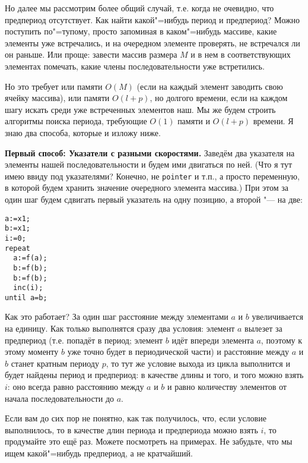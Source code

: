 Но далее мы рассмотрим более общий случай, т.е. когда не очевидно, что предпериод отсутствует. 
Как найти какой"=нибудь период и предпериод? Можно поступить по"=тупому, просто запоминая в 
каком"=нибудь массиве, какие элементы уже встречались, и на очередном элементе проверять, не 
встречался ли он раньше. Или проще: завести массив размера $M$ и в нем в соответствующих 
элементах помечать, какие члены последовательности уже встретились.

Но это требует или памяти $O(M)$ (если на каждый элемент заводить свою ячейку массива), или 
памяти $O(l+p)$, но долгого времени, если на каждом шагу искать среди уже встреченных 
элементов наш. Мы же будем строить алгоритмы поиска периода, требующие $O(1)$ памяти и 
$O(l+p)$ времени. Я знаю два способа, которые и изложу ниже.

\textbf{Первый способ: Указатели с разными скоростями.} Заведём два указателя на элементы нашей 
последовательности и будем ими двигаться по ней. (Что я тут имею ввиду под указателями? 
Конечно, не \texttt{pointer} и т.п., а просто переменную, в которой будем хранить значение 
очередного элемента массива.) При этом за один шаг будем сдвигать первый указатель на одну 
позицию, а второй "--- на две:

\pagebreak[3]
\begin{codesampleo}\begin{verbatim}
a:=x1;
b:=x1;
i:=0;
repeat
  a:=f(a);
  b:=f(b);
  b:=f(b);
  inc(i);
until a=b;
\end{verbatim}
\end{codesampleo}

Как это работает? За один шаг расстояние между элементами $a$ и $b$ увеличивается на единицу. 
Как только выполнятся сразу два условия: элемент $a$ вылезет за предпериод (т.е. попадёт в 
период; элемент $b$ идёт впереди элемента $a$, поэтому к этому моменту $b$ уже точно будет в 
периодической части) и расстояние между $a$ и $b$ станет кратным периоду $p$, то тут же 
условие выхода из цикла выполнится и будет найдены период и предпериод: в качестве длины и того, 
и того можно взять $i$: оно всегда равно расстоянию между $a$ и $b$ и равно количеству 
элементов от начала последовательности до $a$.

Если вам до сих пор не понятно, как так получилось, что, если условие 
выполнилось, то в качестве длин периода и предпериода можно взять $i$, то продумайте это ещё 
раз. Можете посмотреть на примерах. Не забудьте, что мы ищем какой"=нибудь предпериод, а не 
кратчайший.


